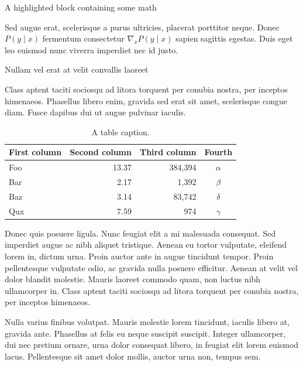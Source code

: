 \documentclass[final]{beamer}
\newlength{\colwidth}
\begin{document}
\begin{frame}[t]
\begin{columns}[t]
\begin{column}{\colwidth}
\begin{exampleblock}{A highlighted block containing some math}

    Sed augue erat, scelerisque a purus ultricies, placerat porttitor neque.
    Donec $P(y \mid x)$ fermentum consectetur $\nabla_x P(y \mid x)$ sapien
    sagittis egestas. Duis eget leo euismod nunc viverra imperdiet nec id
    justo.

  \end{exampleblock}

  \begin{block}{Nullam vel erat at velit convallis laoreet}

    Class aptent taciti sociosqu ad litora torquent per conubia nostra, per
    inceptos himenaeos. Phasellus libero enim, gravida sed erat sit amet,
    scelerisque congue diam. Fusce dapibus dui ut augue pulvinar iaculis.

    \begin{table}
      \centering
      \begin{tabular}{l r r c}
        \toprule
        \textbf{First column} & \textbf{Second column} & \textbf{Third column} & \textbf{Fourth} \\
        \midrule
        Foo & 13.37 & 384,394 & $\alpha$ \\
        Bar & 2.17 & 1,392 & $\beta$ \\
        Baz & 3.14 & 83,742 & $\delta$ \\
        Qux & 7.59 & 974 & $\gamma$ \\
        \bottomrule
      \end{tabular}
      \caption{A table caption.}
    \end{table}

    Donec quis posuere ligula. Nunc feugiat elit a mi malesuada consequat. Sed
    imperdiet augue ac nibh aliquet tristique. Aenean eu tortor vulputate,
    eleifend lorem in, dictum urna. Proin auctor ante in augue tincidunt
    tempor. Proin pellentesque vulputate odio, ac gravida nulla posuere
    efficitur. Aenean at velit vel dolor blandit molestie. Mauris laoreet
    commodo quam, non luctus nibh ullamcorper in. Class aptent taciti sociosqu
    ad litora torquent per conubia nostra, per inceptos himenaeos.

    Nulla varius finibus volutpat. Mauris molestie lorem tincidunt, iaculis
    libero at, gravida ante. Phasellus at felis eu neque suscipit suscipit.
    Integer ullamcorper, dui nec pretium ornare, urna dolor consequat libero,
    in feugiat elit lorem euismod lacus. Pellentesque sit amet dolor mollis,
    auctor urna non, tempus sem.


\end{block}
\end{column}
\end{columns}
\end{frame}
\end{document}
